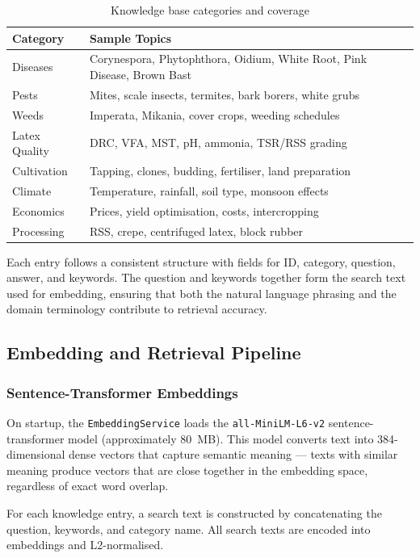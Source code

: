 \begin{table}[H]
\centering
\caption{Knowledge base categories and coverage}
\label{tab:kb_categories}
\begin{tabularx}{\textwidth}{|l|X|}
\hline
\textbf{Category} & \textbf{Sample Topics} \\
\hline
Diseases & Corynespora, Phytophthora, Oidium, White Root, Pink Disease, Brown Bast \\
\hline
Pests & Mites, scale insects, termites, bark borers, white grubs \\
\hline
Weeds & Imperata, Mikania, cover crops, weeding schedules \\
\hline
Latex Quality & DRC, VFA, MST, pH, ammonia, TSR/RSS grading \\
\hline
Cultivation & Tapping, clones, budding, fertiliser, land preparation \\
\hline
Climate & Temperature, rainfall, soil type, monsoon effects \\
\hline
Economics & Prices, yield optimisation, costs, intercropping \\
\hline
Processing & RSS, crepe, centrifuged latex, block rubber \\
\hline
\end{tabularx}
\end{table}

Each entry follows a consistent structure with fields for ID, category, question, answer, and keywords. The question and keywords together form the search text used for embedding, ensuring that both the natural language phrasing and the domain terminology contribute to retrieval accuracy.

\subsection{Embedding and Retrieval Pipeline}

\subsubsection{Sentence-Transformer Embeddings}

On startup, the \texttt{EmbeddingService} loads the \texttt{all-MiniLM-L6-v2} sentence-transformer model (approximately 80~MB). This model converts text into 384-dimensional dense vectors that capture semantic meaning --- texts with similar meaning produce vectors that are close together in the embedding space, regardless of exact word overlap.

For each knowledge entry, a search text is constructed by concatenating the question, keywords, and category name. All search texts are encoded into embeddings and L2-normalised.

